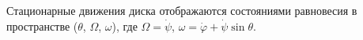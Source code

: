 Стационарные движения диска отображаются состояниями равновесия
в пространстве ($\theta$, $\Omega$, $\omega$), где
$\Omega = \dot{\psi}$, $\omega = \dot{\varphi} + \dot{\psi}\sin{\theta}$.

